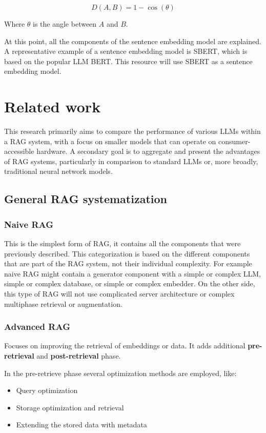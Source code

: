 \documentclass{wseas}
\begin{document}
\begin{equation}
  D(A, B) = 1 - \cos(\theta)
\end{equation}

Where \(\theta\) is the angle between \(A\) and \(B\).

At this point, all the components of the sentence embedding model are
explained. A representative example of a sentence embedding model is
SBERT, which is based on the popular LLM BERT. This resource will use
SBERT as a sentence embedding model.


\section{Related work}
This research primarily aims to compare the performance of various LLMs within a RAG system, with a focus on smaller models that can operate on consumer-accessible hardware. A secondary goal is to aggregate and present the advantages of RAG systems, particularly in comparison to standard LLMs or, more broadly, traditional neural network models.

\subsection{General RAG
systematization}

\subsubsection{Naive RAG}

This is the simplest form of RAG, it contains all the components that were 
previously described. This categorization is based on the different components 
that are part of the RAG system, not their individual complexity. For example
naive RAG might contain a generator component with a simple or complex LLM, simple or complex database,
or simple or complex embedder. On the other side, this type of RAG will not 
use complicated server architecture or complex multiphase retrieval or augmentation. 

\subsubsection{Advanced RAG}

Focuses on improving the retrieval of embeddings or data. It adds
additional \textbf{pre-retrieval} and \textbf{post-retrieval} phase. 

In the pre-retrieve phase several optimization methods are employed, like: 
\begin{itemize}
  \item Query optimization 
  \item Storage optimization and retrieval 
  \item Extending the stored data with metadata 
\end{itemize}
  
\end{document}
